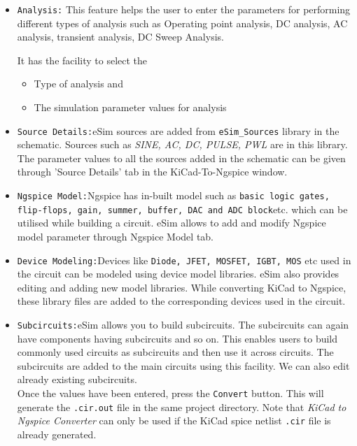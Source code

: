 \begin{itemize}
\item \texttt{Analysis:} This feature helps the user to enter the parameters for performing different types of analysis such as Operating point analysis,  DC analysis,  AC analysis,  transient analysis,  DC Sweep Analysis. 

It has the facility to select the
\begin{itemize}
    \item Type of analysis and
    \item The simulation parameter values for analysis
\end{itemize}

\item \texttt{Source Details:}eSim sources are added from {\tt eSim\_Sources} library in the \linebreak schematic. Sources such as \textit{SINE, AC, DC, PULSE, PWL} are in this library. The parameter values to all the sources added in the schematic can 
be given through 'Source Details' tab in the KiCad-To-Ngspice window.

\item \texttt{Ngspice Model:}Ngspice has in-built model such as \texttt{basic logic gates, \linebreak flip-flops, gain, summer, buffer, DAC and ADC block}etc. which can be utilised while building a circuit.
eSim allows to add and modify Ngspice model parameter through 
Ngspice Model tab.

\item \texttt{Device Modeling:}Devices like \texttt{Diode, JFET, MOSFET, IGBT, MOS} etc used in 
the circuit can be modeled using device model libraries. eSim also 
provides editing and adding new model libraries. While converting 
KiCad to Ngspice, these library files are added to the corresponding 
devices used in the circuit.

\item \texttt{Subcircuits:}eSim allows you to build subcircuits.  The subcircuits can again 
have components having subcircuits and so on. This enables users to 
build commonly used circuits as subcircuits and then use it across 
circuits. The subcircuits are added to the main circuits using this 
facility. We can also edit already existing subcircuits. 
\\
Once the values have been entered, press the {\tt Convert} button. This 
will generate the {\tt .cir.out} file in the same project directory.
Note that \textit{KiCad to Ngspice Converter} can only be used if 
the KiCad spice netlist {\tt .cir} file is already generated.
\\
\end{itemize}


